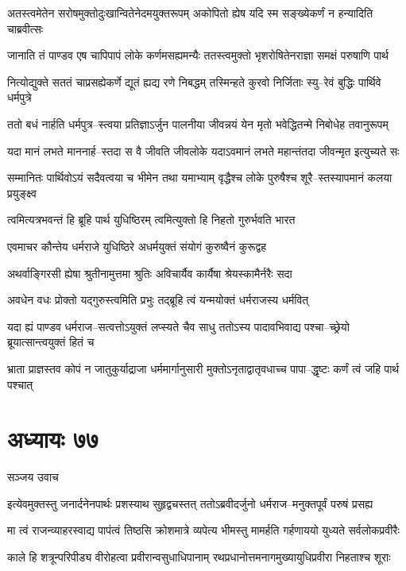 \twolineshloka
{अतस्त्वमेतेन सरोषमुक्तोदुःखान्वितेनेदमयुक्तरूपम्}
{अकोपितो ह्येष यदि स्म सङ्ख्येकर्णं न हन्यादिति चाब्रवीत्सः}


\twolineshloka
{जानाति तं पाण्डव एष चापिपापं लोके कर्णमसह्यमन्यैः}
{ततस्त्वमुक्तो भृशरोषितेनराज्ञा समक्षं परुषाणि पार्थ}


\twolineshloka
{नित्योद्युक्ते सततं चाप्रसह्येकर्णे द्यूतं ह्यद्य रणे निबद्धम्}
{तस्मिन्हते कुरवो निर्जिताः स्यु--रेवं बुद्धिः पार्थिवे धर्मपुत्रे}


\twolineshloka
{ततो बधं नार्हति धर्मपुत्र--स्त्वया प्रतिज्ञाऽर्जुन पालनीया}
{जीवन्नयं येन मृतो भवेद्धितन्मे निबोधेह तवानुरूपम्}


\twolineshloka
{यदा मानं लभते माननार्ह--स्तदा स वै जीवति जीवलोके}
{यदाऽवमानं लभते महान्तंतदा जीवन्मृत इत्युच्यते सः}


\twolineshloka
{सम्मानितः पार्थिवोऽयं सदैवत्वया च भीमेन तथा यमाभ्याम्}
{वृद्धैश्च लोके पुरुषैश्च शूरै--स्तस्यापमानं कलया प्रयुङ्क्ष्व}


\twolineshloka
{त्वमित्यत्रभवन्तं हि ब्रूहि पार्थ युधिष्ठिरम्}
{त्वमित्युक्तो हि निहतो गुरुर्भवति भारत}


\twolineshloka
{एवमाचर कौन्तेय धर्मराजे युधिष्ठिरे}
{अधर्मयुक्तं संयोगं कुरुष्वैनं कुरूद्वह}


\twolineshloka
{अथर्वाङ्गिरसी ह्येषा श्रुतीनामुत्तमा श्रुतिः}
{अविचार्यैव कार्यैषा श्रेयस्कामैर्नरैः सदा}


\twolineshloka
{अवधेन वधः प्रोक्तो यद्गुरुस्त्वमिति प्रभुः}
{तद्ब्रूहि त्वं यन्मयोक्तं धर्मराजस्य धर्मवित्}


\twolineshloka
{यदा ह्यं पाण्डव धर्मराज--सत्वत्तोऽयुक्तं लप्स्यते चैव साधु}
{ततोऽस्य पादावभिवाद्य पश्चा--च्छ्रेयो ब्रूयात्सान्त्वयुक्तं हितं च}


\twolineshloka
{भ्राता प्राज्ञस्तव कोपं न जातुकुर्याद्राजा धर्ममार्गानुसारी}
{मुक्तोऽनृताद्वातृवधाच्च पापा--द्धृष्टः कर्णं त्वं जहि पार्थ पश्चात्}


\chapter{अध्यायः ७७}
\twolineshloka
{सञ्जय उवाच}
{}


\twolineshloka
{इत्येवमुक्तस्तु जनार्दनेनपार्थः प्रशस्याथ सुहृद्वचस्तत्}
{ततोऽब्रवीदर्जुनो धर्मराज--मनुक्तपूर्वं परुषं प्रसह्य}


\twolineshloka
{मा त्वं राजन्व्याहरस्वाद्य पापंत्वं तिष्ठसि क्रोशमात्रे व्यपेत्य}
{भीमस्तु मामर्हति गर्हणाययो युध्यते सर्वलोकप्रवीरैः}


\twolineshloka
{काले हि शत्रून्परिपीड्य वीरोहत्वा प्रवीरान्वसुधाधिपानाम्}
{रथप्रधानोत्तमनागमुख्यायुधिप्रवीरा निहताश्च शूराः}


